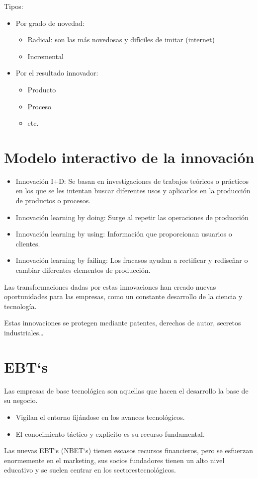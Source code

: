 \documentclass[12pt, twoside, openright]{report} %
\begin{document}
Tipos:
\begin{itemize}
	\item Por grado de novedad:
	      \begin{itemize}
		      \item Radical: son las más novedosas y difíciles de imitar (internet)
		      \item Incremental
	      \end{itemize}
	\item Por el resultado innovador:
	      \begin{itemize}
		      \item Producto
		      \item Proceso
		      \item etc.
	      \end{itemize}
\end{itemize}

\section{Modelo interactivo de la innovación}
\begin{itemize}
	\item Innovación I+D: Se basan en investigaciones de trabajos teóricos o prácticos en los que se les intentan buscar diferentes usos y aplicarlos en la producción de productos o procesos.
	\item Innovación learning by doing: Surge al repetir las operaciones de producción
	\item Innovación learning by using: Información que proporcionan usuarios o clientes.
	\item Innovación learning by failing: Los fracasos ayudan a rectificar y rediseñar o cambiar diferentes elementos de producción.
\end{itemize}


Las transformaciones dadas por estas innovaciones han creado nuevas oportunidades para las empresas, como un constante desarrollo de la ciencia y tecnología.

Estas innovaciones se protegen mediante patentes, derechos de autor, secretos industriales…
\pagebreak
\section{EBT`s}
Las empresas de base tecnológica son aquellas que hacen el desarrollo la base de su negocio.
\begin{itemize}
	\item Vigilan el entorno fijándose en los avances tecnológicos.
	\item El conocimiento táctico y explicito es su recurso fundamental.
\end{itemize}

Las nuevas EBT`s (NBET`s) tienen escasos recursos financieros, pero se esfuerzan enormemente en el marketing, sus socios fundadores tienen un alto nivel educativo y se suelen centrar en los sectorestecnológicos.
\end{document}
